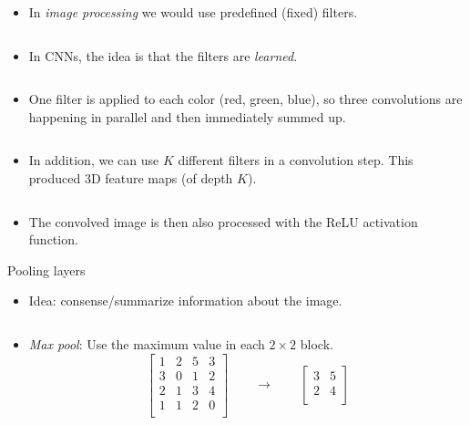 \documentclass[
  10pt,
  ignorenonframetext,
]{beamer}
\providecommand{\tightlist}{%
  \setlength{\itemsep}{0pt}\setlength{\parskip}{0pt}}
\begin{document}
\begin{frame}
\begin{itemize}
\tightlist
\item
  In \emph{image processing} we would use predefined (fixed) filters.
\end{itemize}

\(~\)

\begin{itemize}
\tightlist
\item
  In CNNs, the idea is that the filters are \emph{learned}.
\end{itemize}

\(~\)

\begin{itemize}
\tightlist
\item
  One filter is applied to each color (red, green, blue), so three
  convolutions are happening in parallel and then immediately summed up.
\end{itemize}

\(~\)

\begin{itemize}
\tightlist
\item
  In addition, we can use \(K\) different filters in a convolution step.
  This produced 3D feature maps (of depth \(K\)).
\end{itemize}

\(~\)

\begin{itemize}
\tightlist
\item
  The convolved image is then also processed with the ReLU activation
  function.
\end{itemize}
\end{frame}

\begin{frame}
\begin{block}{Pooling layers}
\protect\hypertarget{pooling-layers}{}
\(~\)

\begin{itemize}
\tightlist
\item
  Idea: consense/summarize information about the image.
\end{itemize}

\(~\)

\begin{itemize}
\tightlist
\item
  \emph{Max pool}: Use the maximum value in each \(2\times 2\) block.
  \[\left[ 
  \begin{matrix}
  1 & 2 & 5 & 3 \\
  3 & 0 & 1 & 2 \\
  2 & 1 & 3 & 4\\
  1 & 1 & 2 & 0 \\
  \end{matrix}
  \right] \qquad \rightarrow \qquad 
  \left[ 
  \begin{matrix}
  3 & 5 \\
  2 & 4 \\
  \end{matrix}\right] \]
\end{itemize}
\end{block}
\end{frame}
\end{document}
